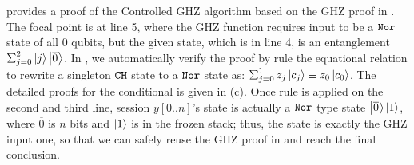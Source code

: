  provides a proof of the Controlled GHZ algorithm based on the GHZ proof in . The focal point is at  line 5, where the GHZ function requires input to be a $\texttt{Nor}$ state of all $0$ qubits, but the given state, which is in line 4, is an entanglement $\scha{2}{}{j}{\ket{\overline{0}}}$. In \qafny, we automatically verify the proof by rule  the equational relation to rewrite a singleton $\texttt{CH}$ state to a $\texttt{Nor}$ state as: $\sch{1}{z_j}{c_j}\equiv z_0\ket{c_0}$. The detailed proofs for the conditional is given in (c). Once rule  is applied on the second and third line, session $y[0..n]$'s state is actually a $\texttt{Nor}$ type state ${\left\vert{\overline{0}}\right\rangle}\left\vert{1}\right\rangle$, where $\overline{0}$ is $n$ bits and $\left\vert{1}\right\rangle$ is in the frozen stack; thus, the state is exactly the GHZ input one, so that we can safely reuse the GHZ proof in  and reach the final conclusion. 






